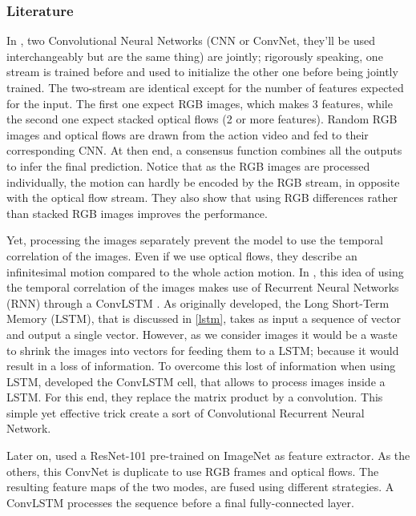 \documentclass[12pt, a4paper]{report}
\begin{document}
				\subsubsection{Literature}
					In \cite{wang2016temporal}, two Convolutional Neural Networks (CNN or ConvNet, they'll be used interchangeably but are the same thing) are \gls{jointly}; rigorously speaking, one stream is trained before and used to initialize the other one before being jointly trained.
					The two-stream are identical except for the number of features expected for the input.
					The first one expect RGB images, which makes 3 features, while the second one expect stacked optical flows (2 or more features).
					Random RGB images and optical flows are drawn from the action video and fed to their corresponding CNN.
					At then end, a consensus function combines all the outputs to infer the final prediction.
					Notice that as the RGB images are processed individually, the motion can hardly be encoded by the RGB stream, in opposite with the optical flow stream.
					They also show that using RGB differences rather than stacked RGB images improves the performance.
					\par
					Yet, processing the images separately prevent the model to use the temporal correlation of the images.
					Even if we use optical flows, they describe an infinitesimal motion compared to the whole action motion.
					In \cite{ye2019two}, this idea of using the temporal correlation of the images makes use of Recurrent Neural Networks (RNN) through a ConvLSTM \cite{shi2015convolutional}.
					As originally developed, the Long Short-Term Memory (LSTM), that is discussed in \ref{lstm}, takes as input a sequence of vector and output a single vector.
					However, as we consider images it would be a waste to shrink the images into vectors for feeding them to a LSTM; because it would result in a loss of information.
					To overcome this lost of information when using LSTM, \cite{shi2015convolutional} developed the ConvLSTM cell, that allows to process images inside a LSTM.
					For this end, they replace the matrix product by a convolution.
					This simple yet effective trick create a sort of Convolutional Recurrent Neural Network.
					\par
					Later on, \cite{ye2019two} used a ResNet-101 pre-trained on ImageNet as feature extractor.
					As the others, this ConvNet is duplicate to use RGB frames and optical flows.
					The resulting feature maps of the two modes, are fused using different strategies.
					A ConvLSTM processes the sequence before a final fully-connected layer.
\end{document}
